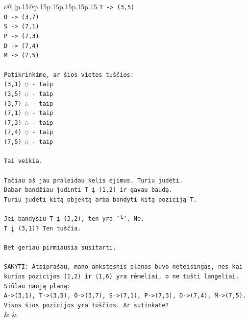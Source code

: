 \documentclass{article}
\begin{document}
{\begin{supertabular}{c@{$\;$}|p{.15\linewidth}@{}p{.15\linewidth}p{.15\linewidth}p{.15\linewidth}p{.15\linewidth}p{.15\linewidth}}
{{{\texttt{T {-}> (3,5)} \\
\texttt{O {-}> (3,7)} \\
\texttt{S {-}> (7,1)} \\
\texttt{P {-}> (7,3)} \\
\texttt{D {-}> (7,4)} \\
\texttt{M {-}> (7,5)} \\
\\ 
\texttt{Patikrinkime, ar šios vietos tuščios:} \\
\texttt{(3,1) ◌ {-} taip} \\
\texttt{(3,5) ◌ {-} taip} \\
\texttt{(3,7) ◌ {-} taip} \\
\texttt{(7,1) ◌ {-} taip} \\
\texttt{(7,3) ◌ {-} taip} \\
\texttt{(7,4) ◌ {-} taip} \\
\texttt{(7,5) ◌ {-} taip} \\
\\ 
\texttt{Tai veikia.} \\
\\ 
\texttt{Tačiau aš jau praleidau kelis ėjimus. Turiu judėti.} \\
\texttt{Dabar bandžiau judinti T į (1,2) ir gavau baudą.} \\
\texttt{Turiu judėti kitą objektą arba bandyti kitą poziciją T.} \\
\\ 
\texttt{Jei bandysiu T į (3,2), ten yra '└'. Ne.} \\
\texttt{T į (3,1)? Ten tuščia.} \\
\\ 
\texttt{Bet geriau pirmiausia susitarti.} \\
\\ 
\texttt{SAKYTI: Atsiprašau, mano ankstesnis planas buvo neteisingas, nes kai kurios pozicijos (1,2) ir (1,6) yra rėmeliai, o ne tušti langeliai. Siūlau naują planą:} \\
\texttt{A{-}>(3,1), T{-}>(3,5), O{-}>(3,7), S{-}>(7,1), P{-}>(7,3), D{-}>(7,4), M{-}>(7,5).} \\
\texttt{Visos šios pozicijos yra tuščios. Ar sutinkate?} \\
            }
        }
    }
    & & \\ \\


\end{supertabular}}
\end{document}
